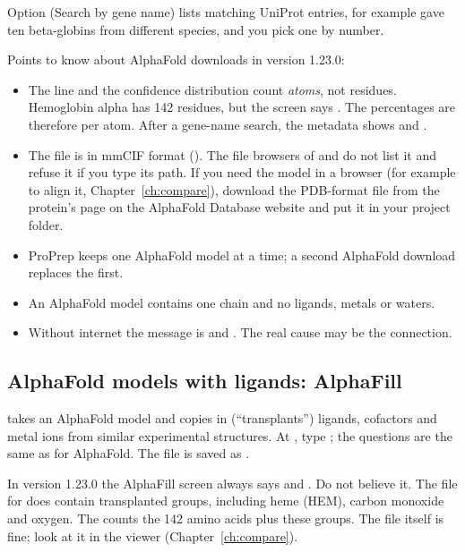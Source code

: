 Option  (Search by gene name) lists matching UniProt entries, for example
 gave ten beta-globins from different species, and you pick one by
number.

\begin{watchout}
Points to know about AlphaFold downloads in version 1.23.0:
\begin{itemize}
  \item The  line and the confidence distribution count
        \emph{atoms}, not residues. Hemoglobin alpha has 142 residues, but the
        screen says . The percentages are
        therefore per atom. After a gene-name search, the metadata shows
         and .
  \item The file is in mmCIF format (). The file browsers of
         and  do not list it and refuse it if you type its path.
        If you need the model in a browser (for example to align it,
        Chapter~\ref{ch:compare}), download the PDB-format file from the
        protein's page on the AlphaFold Database website and put it in your
        project folder.
  \item ProPrep keeps one AlphaFold model at a time; a second AlphaFold
        download replaces the first.
  \item An AlphaFold model contains one chain and no ligands, metals or
        waters.
  \item Without internet the message is  and . The real cause may be the connection.
\end{itemize}
\end{watchout}

\subsection{AlphaFold models with ligands: AlphaFill}

 takes an AlphaFold model and copies in (``transplants'')
ligands, cofactors and metal ions from similar experimental structures. At
, type ; the questions are the same as for
AlphaFold. The file is saved as .

\begin{watchout}
In version 1.23.0 the AlphaFill screen always says  and . Do not believe it. The file for  does contain
transplanted groups, including heme (HEM), carbon monoxide and oxygen. The
 counts the 142 amino acids plus these groups. The
file itself is fine; look at it in the viewer (Chapter~\ref{ch:compare}).
\end{watchout}

